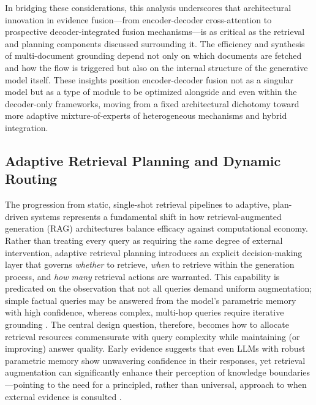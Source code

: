 \documentclass[11pt,a4paper]{article}
\begin{document}
In bridging these considerations, this analysis underscores that architectural innovation in evidence fusion---from encoder-decoder cross-attention to prospective decoder-integrated fusion mechanisms---is as critical as the retrieval and planning components discussed surrounding it. The efficiency and synthesis of multi-document grounding depend not only on which documents are fetched and how the flow is triggered but also on the internal structure of the generative model itself. These insights position encoder-decoder fusion not as a singular model but as a type of module to be optimized alongside and even within the decoder-only frameworks, moving from a fixed architectural dichotomy toward more adaptive mixture-of-experts of heterogeneous mechanisms and hybrid integration.


\subsection{Adaptive Retrieval Planning and Dynamic Routing}


The progression from static, single-shot retrieval pipelines to adaptive, plan-driven systems represents a fundamental shift in how retrieval-augmented generation (RAG) architectures balance efficacy against computational economy. Rather than treating every query as requiring the same degree of external intervention, adaptive retrieval planning introduces an explicit decision-making layer that governs \emph{whether} to retrieve, \emph{when} to retrieve within the generation process, and \emph{how many} retrieval actions are warranted. This capability is predicated on the observation that not all queries demand uniform augmentation; simple factual queries may be answered from the model's parametric memory with high confidence, whereas complex, multi-hop queries require iterative grounding \cite{arxiv:2212.10511v4}. The central design question, therefore, becomes how to allocate retrieval resources commensurate with query complexity while maintaining (or improving) answer quality. Early evidence suggests that even LLMs with robust parametric memory show unwavering confidence in their responses, yet retrieval augmentation can significantly enhance their perception of knowledge boundaries---pointing to the need for a principled, rather than universal, approach to when external evidence is consulted \cite{arxiv:2307.11019v2}.
\end{document}
